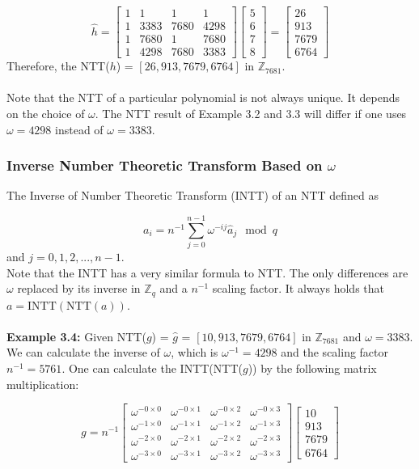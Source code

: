 \documentclass[12pt]{report}
\begin{document}
\[\hat{h}=\begin{bmatrix}1&1&1&1\\ 1&3383&7680&4298\\ 1&7680&1&7680\\ 1&4298&7680&3383\end{bmatrix}\begin{bmatrix}5\\ 6\\ 7\\ 8\end{bmatrix}=\begin{bmatrix}26\\ 913\\ 7679\\ 6764\end{bmatrix}\]
Therefore, the NTT($h$) = $[26,913,7679,6764]$ in $\mathbb{Z}_{7681}.$\\ \\
Note that the NTT of a particular polynomial is not always unique. It depends on the choice of $\omega$. The NTT result of Example 3.2 and 3.3 will differ if one uses $\omega=4298$ instead of $\omega=3383$.

\subsubsection{Inverse Number Theoretic Transform Based on $\omega$}

The Inverse of Number Theoretic Transform (INTT) of an NTT defined as

\[a_{i}=n^{-1}\sum_{j=0}^{n-1}\omega^{-ij}\hat{a}_{j} \mod q\]
and $j=0,1,2,...,n-1$.\\
Note that the INTT has a very similar formula to NTT. The only differences are $\omega$ replaced by its inverse in $\mathbb{Z}_q$ and a $n^{-1}$ scaling factor. It always holds that $a = \text{INTT}(\text{NTT}(a))$. \\ \\
\textbf{Example 3.4:} Given NTT($g$) = $\hat{g}$ = $[10,913,7679,6764]$ in $\mathbb{Z}_{7681}$ and $\omega=3383.$ We can calculate the inverse of $\omega$, which is $\omega^{-1}=4298$ and the scaling factor $n^{-1}=5761.$ One can calculate the INTT(NTT($g$)) by the following matrix multiplication:

\[g=n^{-1}\begin{bmatrix}\omega^{-0\times0}&\omega^{-0\times1}&\omega^{-0\times2}&\omega^{-0\times3}\\ \omega^{-1\times0}&\omega^{-1\times1}&\omega^{-1\times2}&\omega^{-1\times3}\\ \omega^{-2\times0}&\omega^{-2\times1}&\omega^{-2\times2}&\omega^{-2\times3}\\ \omega^{-3\times0}&\omega^{-3\times1}&\omega^{-3\times2}&\omega^{-3\times3}\end{bmatrix}\begin{bmatrix}10\\ 913\\ 7679\\ 6764\end{bmatrix}\]
\end{document}
